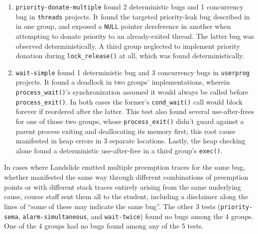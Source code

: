 \begin{enumerate}
	\item {\tt priority-donate-multiple} found 2 deterministic bugs and 1 concurrency bug in {\tt threads} projects.
		It found the targeted priority-leak bug
		described in \sect{\ref{sec:education-pintos-tests}} in one group,
		and exposed a {\tt NULL} pointer dereference in another
		when attempting to donate priority to an already-exited thread.
		The latter bug was observed deterministically.
		A third group neglected to implement priority donation during {\tt lock\_release()} at all,
		which was found deterministically.
	\item {\tt wait-simple} found 1 deterministic bug and 3 concurrency bugs in {\tt userprog} projects.
		It found a deadlock in two groups' implementations,
		wherein {\tt process\_wait()}'s synchronization assumed
		it would always be called before {\tt process\_exit()}.
		In both cases the former's {\tt cond\_wait()} call would block forever if reordered after the latter.
		This test also found several use-after-frees for one of those two groups,
		whose {\tt process\_exit()} didn't guard against a parent process exiting and deallocating its memory first;
		this root cause manifested in heap errors in 3 separate locations.
		Lastly, the heap checking alone found a deterministic use-after-free in a third group's {\tt exec()}.
\end{enumerate}

In cases where Landslide emitted multiple preemption traces for the same bug,
whether manifested the same way through different combinations of preemption points
or with different stack traces entirely arising from the same underlying cause,
course staff sent them all to the student,
including a disclaimer along the lines of ``some of these may indicate the same bug''.
%
The other 3 tests ({\tt priority-sema}, {\tt alarm-simultaneous}, and {\tt wait-twice}) found no bugs among the 4 groups.
One of the 4 groups had no bugs found among any of the 5 tests.


